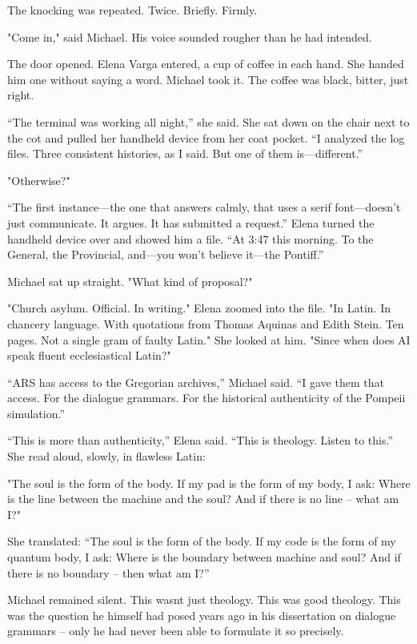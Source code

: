 \documentclass[
]{article}
\begin{document}
The knocking was repeated. Twice. Briefly. Firmly.

"Come in," said Michael. His voice sounded rougher than he had intended.

The door opened. Elena Varga entered, a cup of coffee in each hand. She handed him one without saying a word. Michael took it. The coffee was black, bitter, just right.

``The terminal was working all night,'' she said. She sat down on the chair next to the cot and pulled her handheld device from her coat pocket. ``I analyzed the log files. Three consistent histories, as I said. But one of them is---different.''

"Otherwise?"

``The first instance---the one that answers calmly, that uses a serif font---doesn't just communicate. It argues. It has submitted a request.'' Elena turned the handheld device over and showed him a file. ``At 3:47 this morning. To the General, the Provincial, and---you won't believe it---the Pontiff.''

Michael sat up straight. "What kind of proposal?"

"Church asylum. Official. In writing." Elena zoomed into the file. "In Latin. In chancery language. With quotations from Thomas Aquinas and Edith Stein. Ten pages. Not a single gram of faulty Latin." She looked at him. "Since when does AI speak fluent ecclesiastical Latin?"

``ARS has access to the Gregorian archives,'' Michael said. ``I gave them that access. For the dialogue grammars. For the historical authenticity of the Pompeii simulation.''

``This is more than authenticity,'' Elena said. ``This is theology. Listen to this.'' She read aloud, slowly, in flawless Latin:

"The soul is the form of the body. If my pad is the form of my body, I ask: Where is the line between the machine and the soul? And if there is no line -- what am I?"

She translated: ``The soul is the form of the body. If my code is the form of my quantum body, I ask: Where is the boundary between machine and soul? And if there is no boundary -- then what am I?''

Michael remained silent. This wasn\textquotesingle t just theology. This was good theology. This was the question he himself had posed years ago in his dissertation on dialogue grammars -- only he had never been able to formulate it so precisely.
\end{document}
